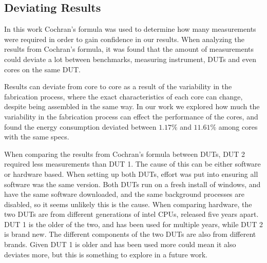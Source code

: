 \subsection{Deviating Results}

In this work Cochran's formula was used to determine how many measurements were required in order to gain confidence in our results. When analyzing the results from Cochran's formula, it was found that the amount of measurements could deviate a lot between benchmarks, measuring instrument, DUTs and even cores on the same DUT.

Results can deviate from core to core as a result of the variability in the fabrication process, where the exact characteristics of each core can change, despite being assembled in the same way.\cite{Mauzy2020} In our work we explored how much the variability in the fabrication process can effect the performance of the cores, and found the energy consumption deviated between $1.17\%$ and $11.61\%$ among cores with the same specs.

When comparing the results from Cochran's formula between DUTs, DUT 2 required less measurements than DUT 1. The cause of this can be either software or hardware based. When setting up both DUTs, effort was put into ensuring all software was the same version. Both DUTs run on a fresh install of windows, and have the same software downloaded, and the same background processes are disabled, so it seems unlikely this is the cause. When comparing hardware, the two DUTs are from different generations of intel CPUs, released five years apart. DUT 1 is the older of the two, and has been used for multiple years, while DUT 2 is brand new. The different components of the two DUTs are also from different brands. Given DUT 1 is older and has been used more could mean it also deviates more, but this is something to explore in a future work. %




